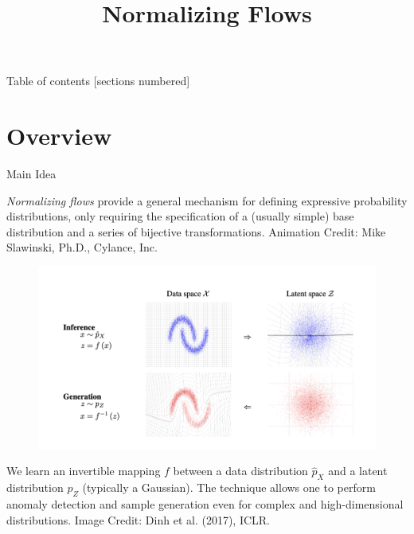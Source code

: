 \documentclass[10pt]{beamer}
\title{Normalizing Flows}
\begin{document}
\maketitle

\begin{frame}{Table of contents}
  [sections numbered]
  \tableofcontents[hideallsubsections]
\end{frame}

\section{Overview}
 
\begin{frame}{Main Idea}

\scriptsize
\textit{Normalizing flows} provide a general mechanism for defining expressive probability distributions, only requiring the specification of a (usually simple) base distribution and a series of
bijective transformations.
\vfill
\tiny \hfill Animation Credit: Mike Slawinski, Ph.D., Cylance, Inc.
\end{frame}
    
\begin{frame}{}

\begin{figure}[H]
\includegraphics[width=\textwidth]{images/nf_idea}
\end{figure} 
We learn an invertible mapping $f$ between a data distribution $\widehat{p}_X$ and a latent distribution $p_Z$ (typically a Gaussian).  The technique allows one to perform anomaly detection and sample generation even for complex and high-dimensional distributions.
\vfill
\tiny \hfill Image Credit: Dinh et al. (2017), ICLR. 
 \end{frame}
 
\end{document}
